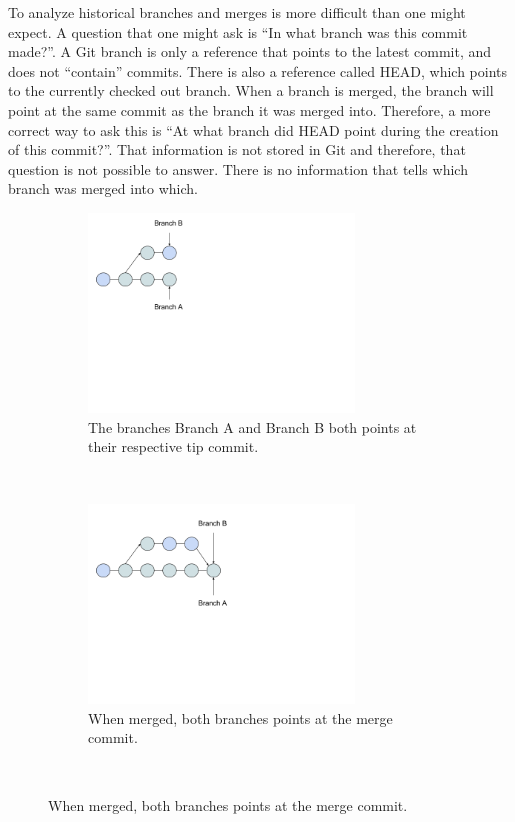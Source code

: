 To analyze historical branches and merges is more difficult than one might expect. A question that one might ask is “In what branch was this commit made?”. A Git branch is only a reference that points to the latest commit, and does not “contain” commits. There is also a reference called HEAD, which points to the currently checked out branch. When a branch is merged, the branch will point at the same commit as the branch it was merged into. Therefore, a more correct way to ask this is “At what branch did HEAD point during the creation of this commit?”. That information is not stored in Git and therefore, that question is not possible to answer. There is no information that tells which branch was merged into which.
\begin{figure}
  \centering
  \begin{subfigure}[b]{0.3\textwidth}
      \includegraphics[width=200pt]{figure/branch1.png}
      \caption{The branches Branch A and Branch B both points at their respective tip commit.}
      \label{fig:mbranch1}
  \end{subfigure}
  ~ %
  \begin{subfigure}[b]{0.3\textwidth}
      \includegraphics[width=200pt]{figure/branch2.png}
      \caption{When merged, both branches points at the merge commit.}
      \label{fig:mbranch2}
  \end{subfigure}
  ~ %

\end{figure}
